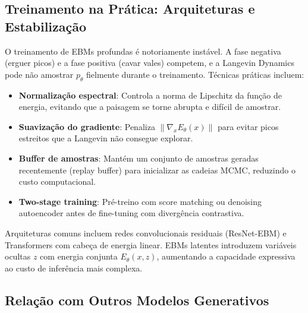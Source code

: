\documentclass{tufte-handout}
\let\subsubsection\subsection
\begin{document}
\subsubsection{Treinamento na Prática: Arquiteturas e Estabilização}

O treinamento de EBMs profundas é notoriamente instável. A fase negativa (erguer picos) e a fase positiva (cavar vales) competem, e a Langevin Dynamics pode não amostrar $p_\theta$ fielmente durante o treinamento. Técnicas práticas incluem:

\begin{itemize}
    \item \textbf{Normalização espectral}: Controla a norma de Lipschitz da função de energia, evitando que a paisagem se torne abrupta e difícil de amostrar.
    \item \textbf{Suavização do gradiente}: Penaliza $\|\nabla_x E_\theta(x)\|$ para evitar picos estreitos que a Langevin não consegue explorar.
    \item \textbf{Buffer de amostras}: Mantém um conjunto de amostras geradas recentemente (replay buffer) para inicializar as cadeias MCMC, reduzindo o custo computacional.
    \item \textbf{Two-stage training}: Pré-treino com score matching ou denoising autoencoder antes de fine-tuning com divergência contrastiva.
\end{itemize}

Arquiteturas comuns incluem redes convolucionais residuais (ResNet-EBM) e Transformers com cabeça de energia linear. EBMs latentes introduzem variáveis ocultas $z$ com energia conjunta $E_\theta(x, z)$, aumentando a capacidade expressiva ao custo de inferência mais complexa.

\subsubsection{Relação com Outros Modelos Generativos}
\end{document}
